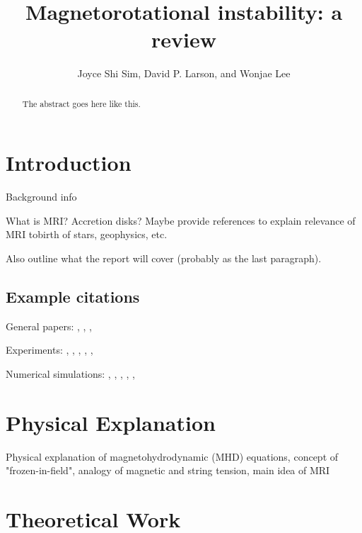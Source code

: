 \documentclass{jfm}
\title[Magnetorotational instability]{Magnetorotational instability: a review}
\author[J.~S. Sim, D.~P. Larson, and W. Lee]{Joyce Shi Sim, David P. Larson, 
    and Wonjae Lee}
\affiliation{University of California, San Diego}
\begin{document}
\maketitle


\begin{abstract}
The abstract goes here like this.
\end{abstract}


\section{Introduction}
\label{sec:intro}
Background info

What is MRI? Accretion disks? Maybe provide references to explain relevance of 
MRI tobirth of stars, geophysics, etc.

Also outline what the report will cover (probably as the last paragraph).


\subsection{Example citations}
General papers: \cite{Julien2010}, \cite{Chandrasekhar1960}, \cite{Acheson1973},
\cite{Balbus1991}

Experiments: \cite{Gailitis2002}, \cite{Sisan2004}, \cite{Stefani2006},
\cite{Stefani2007}, \cite{Ji2010}, \cite{Seilmayer2012}

Numerical simulations: \cite{Kageyama2004}, \cite{Liu2008}, \cite{Gissinger2011}, 
\cite{Travnikov2011}, \cite{Kirillov2012}, \cite{Zhao2012}



\section{Physical Explanation}
Physical explanation of magnetohydrodynamic (MHD) equations, concept of "frozen-in-field",
analogy of magnetic and string tension, main idea of MRI



\section{Theoretical Work}
\label{sec:theory}
\end{document}
